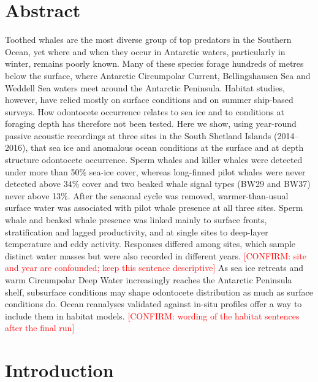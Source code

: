 \documentclass[
  11pt,
]{article}
\title{\ins{TITLE}}
\author{\ins{Authors and affiliations}}
\date{2026-11-20}
\newcommand{\conf}[1]{\textcolor{red}{[CONFIRM: #1]}}
\begin{document}
\maketitle


\section*{Abstract}\label{abstract}

Toothed whales are the most diverse group of top predators in the
Southern Ocean, yet where and when they occur in Antarctic waters,
particularly in winter, remains poorly known. Many of these species
forage hundreds of metres below the surface, where Antarctic Circumpolar
Current, Bellingshausen Sea and Weddell Sea waters meet around the
Antarctic Peninsula. Habitat studies, however, have relied mostly on
surface conditions and on summer ship-based surveys. How odontocete
occurrence relates to sea ice and to conditions at foraging depth has
therefore not been tested. Here we show, using year-round passive
acoustic recordings at three sites in the South Shetland Islands
(2014--2016), that sea ice and anomalous ocean conditions at the surface
and at depth structure odontocete occurrence. Sperm whales and killer
whales were detected under more than 50\% sea-ice cover, whereas
long-finned pilot whales were never detected above 34\% cover and two
beaked whale signal types (BW29 and BW37) never above 13\%. After the
seasonal cycle was removed, warmer-than-usual surface water was
associated with pilot whale presence at all three sites. Sperm whale and
beaked whale presence was linked mainly to surface fronts,
stratification and lagged productivity, and at single sites to
deep-layer temperature and eddy activity. Responses differed among
sites, which sample distinct water masses but were also recorded in
different years.
\conf{site and year are confounded; keep this sentence descriptive} As
sea ice retreats and warm Circumpolar Deep Water increasingly reaches
the Antarctic Peninsula shelf, subsurface conditions may shape
odontocete distribution as much as surface conditions do. Ocean
reanalyses validated against in-situ profiles offer a way to include
them in habitat models.
\conf{wording of the habitat sentences after the final run}

\section{Introduction}\label{introduction}
\end{document}
